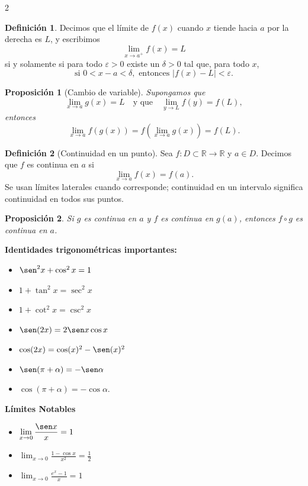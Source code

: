 \documentclass[letterpaper,12pt]{article}
\theoremstyle{plain}
\newtheorem{prop}{Proposici\'on}
\theoremstyle{definition}
\newtheorem{defi}{Definici\'on}
\newcommand{\1}{\mathbbm{1}}
\begin{document}
\begin{tcolorbox}[title = Resumen, colframe=cyan!80!black, colback=cyan!5!white, boxrule=0.8pt, arc=4pt, auto outer arc]

\begin{multicols}{2}
\begin{defi}
Decimos que el límite de \( f(x) \) cuando \( x \) tiende hacia \( a \) por la derecha es \( L \), y escribimos
\[
\lim_{x \to a^+} f(x) = L
\]
si y solamente si para todo \( \varepsilon > 0 \) existe un \( \delta > 0 \) tal que, para todo \( x \),
\[
\text{si } 0 < x - a < \delta, \text{ entonces } |f(x) - L| < \varepsilon.
\]
\end{defi}

\begin{prop}[Cambio de variable]
Supongamos que
\[
\lim_{x \to a} g(x) = L \quad \text{y que} \quad \lim_{y \to L} f(y) = f(L),
\]
entonces
\[
\lim_{x \to a} f(g(x)) = f\left( \lim_{x \to a} g(x) \right) = f(L).
\]
\end{prop}

\begin{defi}[Continuidad en un punto]
    Sea \( f : D \subset \mathbb{R} \to \mathbb{R} \) y \( a \in D \). Decimos que \( f \) es continua en \( a \) si
\[
\lim_{x \to a} f(x) = f(a).
\]
Se usan límites laterales cuando corresponde; continuidad en un intervalo significa continuidad en todos sus puntos.
\end{defi}

\begin{prop}
Si \( g \) es continua en \( a \) y \( f \) es continua en \( g(a) \), entonces \( f \circ g \) es continua en \( a \).
\end{prop}

\textbf{Identidades trigonométricas importantes:}
\begin{itemize}
    \item $\sen^2 x + \cos^2 x = 1$
    \item $1 + \tan^2 x = \sec^2 x$
    \item $1 + \cot^2 x = \csc^2 x$
    \item $\sen(2x) = 2\sen x \cos x$
    \item $\cos(2x)=\cos(x)^2-\sen(x)^2$
    \item $\sen(\pi + \alpha) = - \sen \alpha$ 
    \item $\cos(\pi + \alpha) = - \cos \alpha.$
\end{itemize}
\textbf{Límites Notables}
\begin{itemize}
    \item $\displaystyle \lim_{x \to 0} \frac{\sen x}{x} = 1$
    \item $\displaystyle \lim_{x \to 0} \frac{1 - \cos x}{x^2} = \frac{1}{2}$
    \item $\displaystyle \lim_{x \to 0} \frac{e^x - 1}{x} = 1$
\end{itemize}


\end{multicols}
\end{tcolorbox}
\end{document}

